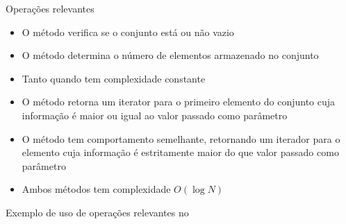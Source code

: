 \begin{frame}[fragile]{Operações relevantes}

    \begin{itemize}
        \item O método  verifica se o conjunto está ou não vazio

        \item O método  determina o número de elementos armazenado no conjunto

        \item Tanto  quando  tem complexidade constante

        \item O método  retorna um iterator para o primeiro elemento do
            conjunto cuja informação é maior ou igual ao valor passado como parâmetro

        \item O método  tem comportamento semelhante, retornando um iterador
            para o elemento cuja informação é estritamente maior do que valor passado como parâmetro

        \item Ambos métodos tem complexidade $O(\log N)$
    \end{itemize}

\end{frame}

\begin{frame}[fragile]{Exemplo de uso de operações relevantes no }
\end{frame}

